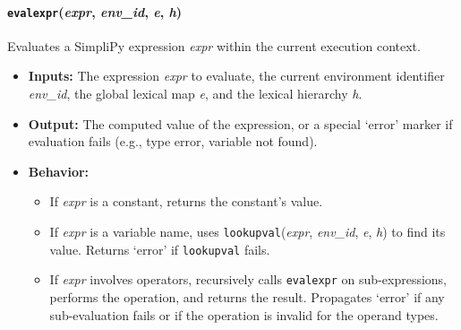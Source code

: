 \documentclass[runningheads]{llncs}
\begin{document}
\paragraph{\texttt{evalexpr}(\textit{expr}, \textit{env\_id}, \textit{e}, \textit{h})}
Evaluates a SimpliPy expression \textit{expr} within the current execution
context.
\begin{itemize}
	\item \textbf{Inputs:} The expression \textit{expr} to evaluate, the current
	      environment identifier \textit{env\_id}, the global lexical map \textit{e}, and
	      the lexical hierarchy \textit{h}.
	\item \textbf{Output:} The computed value of the expression, or a special
	      `error' marker if evaluation fails (e.g., type error, variable not found).
	\item \textbf{Behavior:}
	      \begin{itemize}
		      \item If \textit{expr} is a constant, returns the constant's value.
		      \item If \textit{expr} is a variable name, uses
		            \texttt{lookupval}(\textit{expr}, \textit{env\_id}, \textit{e}, \textit{h}) to
		            find its value. Returns `error' if \texttt{lookupval} fails.
		      \item If \textit{expr} involves operators, recursively calls
		            \texttt{evalexpr} on sub-expressions, performs the operation, and returns the
		            result. Propagates `error' if any sub-evaluation fails or if the operation is
		            invalid for the operand types.
	      \end{itemize}
\end{itemize}
\end{document}
